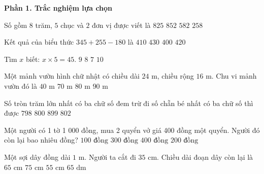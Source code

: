 \textbf{Phần 1. Trắc nghiệm lựa chọn}

\begin{ex} %
Số gồm $8$ trăm, $5$ chục và $2$ đơn vị được viết là
\choice
{$825$}
{\True $852$}
{$582$}
{$258$}
\end{ex}

\begin{ex} %
Kết quả của biểu thức $345 + 255 - 180$ là
\choice
{$410$}
{$430$}
{$400$}
{\True $420$}
\end{ex}

\begin{ex} %
Tìm $x$ biết: $x \times 5 = 45$.
\choice
{\True $9$}
{$8$}
{$7$}
{$10$}
\end{ex}

\begin{ex} %
Một mảnh vườn hình chữ nhật có chiều dài $24\text{ m}$, chiều rộng $16\text{ m}$. Chu vi mảnh vườn đó là
\choice
{$40\text{ m}$}
{$70\text{ m}$}
{\True $80\text{ m}$}
{$90\text{ m}$}
\end{ex}

\begin{ex} %
Số tròn trăm lớn nhất có ba chữ số đem trừ đi số chẵn bé nhất có ba chữ số thì được
\choice
{$798$}
{\True $800$}
{$899$}
{$802$}
\end{ex}

\begin{ex} %
Một người có 1 tờ 1 000 đồng, mua 2 quyển vở giá 400 đồng một quyển. Người đó còn lại bao nhiêu đồng?
\choice
{$100\text{ đồng}$}
{$300\text{ đồng}$}
{$400\text{ đồng}$}
{\True $200\text{ đồng}$}
\end{ex}

\begin{ex} %
Một sợi dây đồng dài $1\text{ m}$. Người ta cắt đi $35\text{ cm}$. Chiều dài đoạn dây còn lại là
\choice
{\True $65\text{ cm}$}
{$75\text{ cm}$}
{$55\text{ cm}$}
{$65\text{ dm}$}
\end{ex}


